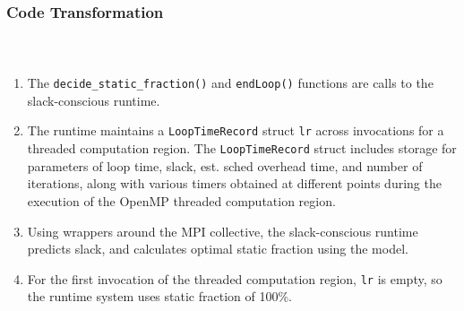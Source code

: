 \begin{frame}
\frametitle{Code Transformation}
\vspace*{-0.4in}
\begin{columns}
\begin{figure}
\label{code:origOMPcode}
\begin{center} 

\end{center} 
\end{figure}
\begin{figure}
\label{code:refactoredOMPcode}
\begin{center} 

\end{center} 
\end{figure}
\end{columns}
\begin{enumerate}
\tiny \item \tiny The \texttt{decide\_static\_fraction()} and 
\texttt{endLoop()} functions are calls to the slack-conscious runtime. 
\item \tiny The runtime maintains a \texttt{LoopTimeRecord} struct
  \texttt{lr} across invocations for a threaded computation region. 
  The \texttt{LoopTimeRecord} struct includes storage for
  parameters of loop time, slack, est. sched overhead time, and number of
  iterations, along with various timers obtained at different points during
  the execution of the OpenMP threaded computation region. 
\item \tiny Using wrappers around the MPI collective, the 
  slack-conscious runtime predicts slack, and calculates optimal
  static fraction using the model. 
\item \tiny For the first invocation of the threaded computation
  region, \texttt{lr} is empty, so the runtime system uses static
  fraction of 100\%. 
\end{enumerate}
\end{frame}

